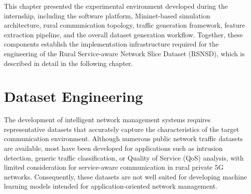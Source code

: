 \documentclass[12pt,a4paper]{report}
\begin{document}

	
	This chapter presented the experimental environment developed during the internship, including the software platform, Mininet-based simulation architecture, rural communication topology, traffic generation framework, feature extraction pipeline, and the overall dataset generation workflow. Together, these components establish the implementation infrastructure required for the engineering of the Rural Service-aware Network Slice Dataset (RSNSD), which is described in detail in the following chapter.
	
	
	
	\chapter{Dataset Engineering}
	\label{chap:dataset_engineering}
	
	The development of intelligent network management systems requires representative datasets that accurately capture the characteristics of the target communication environment. Although numerous public network traffic datasets are available, most have been developed for applications such as intrusion detection, generic traffic classification, or Quality of Service (QoS) analysis, with limited consideration for service-aware communication in rural private 5G networks. Consequently, these datasets are not well suited for developing machine learning models intended for application-oriented network management.
	
\end{document}
